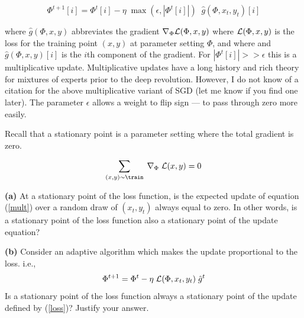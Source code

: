 \documentclass{article}
\newcommand{\solution}[1]{}
\begin{document}
\begin{equation}
  \Phi^{t+1}[i] = \Phi^t[i] - \eta \;\max(\epsilon,|\Phi^t[i]|)\;\;\hat{g}(\Phi,x_t,y_t)[i]
  \label{mult}
\end{equation}

where $\hat{g}(\Phi,x,y)$ abbreviates the gradient $\nabla_\Phi{\cal L}(\Phi,x,y)$ where ${\cal L}(\Phi,x,y)$ is the loss for the training point $(x,y)$ at parameter setting $\Phi$, and where
and $\hat{g}(\Phi,x,y)[i]$ is the $i$th component of the gradient.  For $|\Phi^t[i]| >> \epsilon$ this is a multiplicative update.
Multiplicative updates have a long history and rich theory for mixtures of experts prior to the deep revolution.  However, I do not know of a citation for
the above multiplicative variant of SGD (let me know if you find one later).  The parameter $\epsilon$ allows a weight to flip sign --- to pass through zero more easily.

Recall that a stationary point is a parameter setting where the total gradient is zero.

\begin{equation}
  \sum_{(x,y) \sim \train}\; \nabla_\Phi\;{\cal L}(x,y) = 0
  \label{stationary}
\end{equation}

\medskip
    {\bf (a)} At a stationary point of the loss function, is the expected update of equation (\ref{mult}) over a random draw of $(x_t,y_t)$ always equal to zero.  In other words, is a stationary point of the loss function
    also a stationary point of the update equation?

\solution{Yes, a stationary point of the loss function is also a stationary point of the update equation.
  \begin{eqnarray*}
    & & E_{(x,y) \sim \train} \;\;\eta\;\min(\epsilon,|\Phi^t[i]|)\;\left(\nabla_\Phi \;{\cal L}(\Phi,x,y)\right)[i]  \\
    \\
    & = & \eta\;\min(\epsilon,|\Phi[i]|)\;E_{(x,y)\sim\train} \left(\nabla_\Phi {\cal L}(\Phi,x,y)\right)[i] \\
    \\
    & = & 0
  \end{eqnarray*}
  }

\medskip
{\bf (b)} Consider an adaptive algorithm which makes the update proportional to the loss. i.e.,
\begin{equation}
  \Phi^{t+1}= \Phi^t - \eta\;{\cal L}(\Phi,x_t,y_t)\;\hat{g}^t
  \label{loss}
\end{equation}
Is a stationary point of the loss function always a stationary point of the update defined by (\ref{loss})?  Justify your answer.
\end{document}
